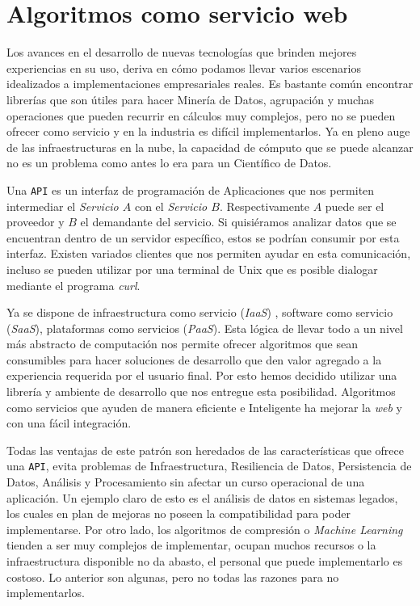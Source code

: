\section{Algoritmos como servicio web }

	Los avances en el desarrollo de nuevas tecnologías que brinden mejores experiencias en su uso, deriva en cómo podamos llevar varios escenarios idealizados a implementaciones empresariales reales. Es bastante común encontrar librerías que son útiles para hacer Minería de Datos, agrupación y muchas operaciones que pueden recurrir en cálculos muy complejos, pero no se pueden ofrecer como servicio y en la industria es difícil implementarlos. Ya en pleno auge de las infraestructuras en la nube, la capacidad de cómputo que se puede alcanzar no es un problema como antes lo era para un Científico de Datos.


	Una \texttt{API} es un interfaz de programación de Aplicaciones que nos permiten intermediar el \emph{Servicio $A$} con el \emph{Servicio $B$}. Respectivamente $A$ puede ser el proveedor y $B$ el demandante del servicio. Si quisiéramos analizar datos que se encuentran dentro de un servidor específico, estos se podrían consumir por esta interfaz. Existen variados clientes que nos permiten ayudar en esta comunicación, incluso se pueden utilizar por una terminal de {Unix} que es posible dialogar mediante el programa \emph{curl}.
	
	Ya se dispone de infraestructura como servicio (\emph{IaaS}) , software como servicio (\emph{SaaS}), plataformas como servicios (\emph{PaaS}). Esta lógica de llevar todo a un nivel más abstracto de computación nos permite ofrecer  algoritmos que sean consumibles para hacer soluciones de desarrollo que den valor agregado a la experiencia requerida por el usuario final. Por esto hemos decidido utilizar una librería y ambiente de desarrollo que nos entregue esta posibilidad. Algoritmos como servicios que ayuden de manera eficiente e Inteligente ha mejorar la \emph{web} y con una fácil integración. 
	
	Todas las ventajas de este patrón son heredados de las características que ofrece una \texttt{API}, evita problemas de Infraestructura, Resiliencia de Datos, Persistencia de Datos, Análisis y Procesamiento sin afectar un curso operacional de una aplicación. Un ejemplo claro de esto es el análisis de datos en sistemas legados, los cuales en plan de mejoras no poseen la compatibilidad para poder implementarse. Por otro lado, los algoritmos de compresión o  \emph{Machine Learning} tienden a ser muy complejos de implementar, ocupan muchos recursos o la infraestructura disponible no da abasto, el personal que puede implementarlo es costoso. Lo anterior son algunas, pero no todas las razones para no  implementarlos. 